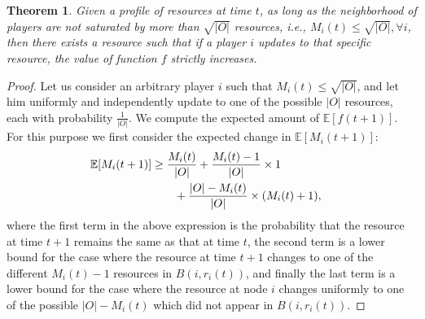 \documentclass[conference, 10pt, twocolumn]{ieeeconf}
\newtheorem{theorem}{Theorem}
\begin{document}
\smallskip
\begin{theorem}\label{thm:randomization}
Given a profile of resources at time $t$, as long as the neighborhood of players are not saturated by more than $\sqrt{|O|}$ resources, i.e., $M_i(t)\leq \sqrt{|O|}, \forall i$, then there exists a resource such that if a player $i$ updates to that specific resource, the value of function $f$ strictly increases.
\end{theorem}
\begin{proof}  
Let us consider an arbitrary player $i$ such that $M_i(t)\leq \sqrt{|O|}$, and let him uniformly and independently update to one of the possible $|O|$ resources, each with probability $\frac{1}{|O|}$. We compute the expected amount of $\mathbb{E}[f(t+1)]$. For this purpose we first consider the expected change in $\mathbb{E}[M_i(t+1)]$:  
\begin{align}\nonumber
\mathbb{E}[M_i(t+1)]&\ge \frac{M_i(t)}{|O|}+\frac{M_i(t)-1}{|O|}\times 1\cr 
&\qquad+\frac{|O|-M_i(t)}{|O|}\times (M_i(t)+1),
\end{align}
where the first term in the above expression is the probability that the resource at time $t+1$ remains the same as that at time $t$, the second term is a lower bound for the case where the resource at time $t+1$ changes to one of the different $M_i(t)-1$ resources in $B(i,r_i(t))$, and finally the last term is a lower bound for the case where the resource at node $i$ changes uniformly to one of the possible $|O|-M_i(t)$ which did not appear in $B(i,r_i(t))$.


\end{proof}
\end{document}
